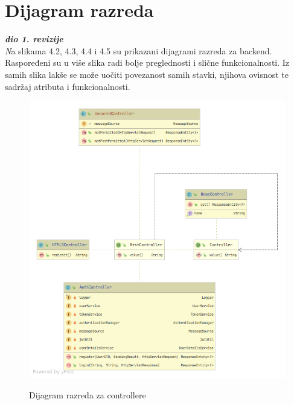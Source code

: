 			\eject
			
			
		\section{Dijagram razreda}
		
			
			\textbf{\textit{dio 1. revizije}}\\
			
			\textit Na slikama 4.2, 4.3, 4.4 i 4.5 su prikazani dijagrami razreda za backend. Raspoređeni su u više slika radi bolje preglednosti i slične funkcionalnosti. Iz samih slika lakše se može uočiti povezanost samih stavki, njihova ovisnost te sadržaj atributa i funkcionalnosti.
			
			
			\begin{figure}[H]
				\includegraphics[scale=0.65]{slike/ControllersDiagram.png} %
				\centering
				\caption \newline Dijagram razreda za controllere
				\label{fig:promjene}
			\end{figure}
			
